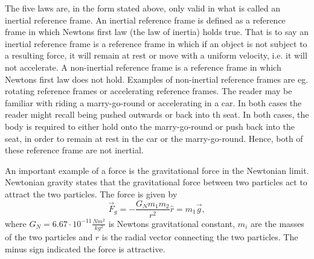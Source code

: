 The five laws are, in the form stated above, only valid in what is called an inertial reference frame. An inertial reference frame is defined as a reference frame in which Newtons first law (the law of inertia) holds true. That is to say an inertial reference frame is a reference frame in which if an object is not subject to a resulting force, it will remain at rest or move with a uniform velocity, i.e. it will not accelerate. A non-inertial reference frame is a reference frame in which Newtons first law does not hold. Examples of non-inertial reference frames are eg. rotating reference frames or accelerating reference frames. The reader may be familiar with riding a marry-go-round or accelerating in a car. In both cases the reader might recall being pushed outwards or back into th seat. In both cases, the body is required to either hold onto the marry-go-round or push back into the seat, in order to remain at rest in the car or the marry-go-round. Hence, both of these reference frame are not inertial.
\begin{example}
	An important example of a force is the gravitational force in the Newtonian limit. Newtonian gravity states that the gravitational force between two particles act to attract the two particles. The force is given by
	\begin{equation}
		\vec{F}_g=-\frac{G_Nm_1m_2}{r^2}\hat{r}=m_1\vec{g},
	\end{equation} 
	where $G_N=6.67\cdot 10^{-11}\frac{Nm^2}{kg^2}$ is Newtons gravitational constant, $m_i$ are the masses of the two particles and $r$ is the radial vector connecting the two particles. The minus sign indicated the force is attractive.
\end{example}
